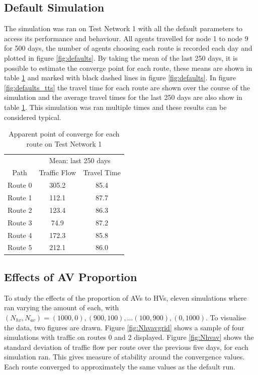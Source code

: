 \documentclass[12pt, a4paper, onecolumn]{article}
\begin{document}
\subsection{Default Simulation}
The simulation was ran on Test Network 1 with all the default parameters to access its performance and behaviour. All agents travelled for node 1 to node 9 for 500 days, the number of agents choosing each route is recorded each day and plotted in figure \ref{fig:defaults}. By taking the mean of the last 250 days, it is possible to estimate the converge point for each route, these means are shown in table \ref{tab:defaultcov} and marked with black dashed lines in figure \ref{fig:defaults}. In figure \ref{fig:defaults_tts} the travel time for each route are shown over the course of the simulation and the average travel times for the last 250 days are also show in table \ref{tab:defaultcov}. This simulation was ran multiple times and these results can be considered typical.

\begin{table}[h!]
	\begin{center}
		\caption{Apparent point of converge for each route on Test Network 1}
		\label{tab:defaultcov}
		\begin{tabular}{c|c|c}
			\hline
			 & \multicolumn{2}{c}{Mean: last 250 days}\\
			Path & Traffic Flow & Travel Time \\
			\hline
			Route 0 & 305.2 & 85.4\\
			Route 1 & 112.1 & 87.7\\
			Route 2 & 123.4 & 86.3\\
			Route 3 & 74.9 & 87.2\\
			Route 4 & 172.3 & 85.8\\
			Route 5 & 212.1 & 86.0\\
		
			\hline
			\end{tabular}
		\end{center}
	\end{table}



\subsection{Effects of AV Proportion}
To study the effects of the proportion of AVs to HVs, eleven simulations where ran varying the amount of each, with $(N_{hv}, N_{av}) = (1000,0), (900,100), ... (100, 900), (0, 1000)$.
To visualise the data, two figures are drawn. Figure \ref{fig:Nhvavgrid} shows a sample of four simulations with traffic on routes 0 and 2 displayed. Figure \ref{fig:Nhvav} shows the standard deviation of traffic flow per route over the previous five days, for each simulation ran. This gives measure of stability around the convergence values. Each route converged to approximately the same values as the default run. 
\end{document}
